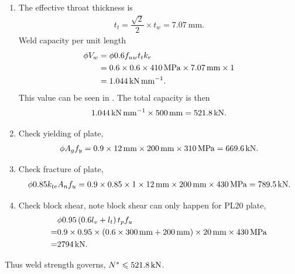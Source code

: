 \begin{solution}
\begin{enumerate}
\item
The effective throat thickness is
\begin{gather*}
t_t=\dfrac{\sqrt{2}}{2}\times{}t_w=\SI{7.07}{\mm}.
\end{gather*}
Weld capacity per unit length
\begin{align*}
\phi{}V_w&=\phi{}0.6f_{uw}t_tk_r\\
&=0.6\times0.6\times\SI{410}{\mega\pascal}\times\SI{7.07}{\milli\meter}\times1\\
&=\SI{1.044}{\kilo\newton\per\milli\meter}.
\end{align*}
This value can be seen in . The total capacity is then
\begin{gather*}
\SI{1.044}{\kilo\newton\per\milli\meter}\times\SI{500}{\milli\meter}=\SI{521.8}{\kilo\newton}.
\end{gather*}
\item
Check yielding of plate,
\begin{gather*}
\phi{}A_gf_y=0.9\times\SI{12}{\milli\meter}\times\SI{200}{\milli\meter}\times\SI{310}{\mega\pascal}=\SI{669.6}{\kilo\newton}.
\end{gather*}
\item
Check fracture of plate,
\begin{gather*}
\phi0.85k_{te}A_nf_u=0.9\times0.85\times1\times\SI{12}{\milli\meter}\times\SI{200}{\milli\meter}\times\SI{430}{\mega\pascal}=\SI{789.5}{\kilo\newton}.
\end{gather*}
\item
Check block shear, note block shear can only happen for PL20 plate,
\begin{align*}
&\phi0.95\left(0.6l_{v}+l_{t}\right)t_pf_u\\=&0.9\times0.95\times\left(0.6\times\SI{300}{\milli\meter}+\SI{200}{\milli\meter}\right)\times\SI{20}{\milli\meter}\times\SI{430}{\mega\pascal}\\
=&\SI{2794}{\kilo\newton}.
\end{align*}
\end{enumerate}
Thus weld strength governs, $N^*\leqslant\SI{521.8}{\kilo\newton}$.
\end{solution}

